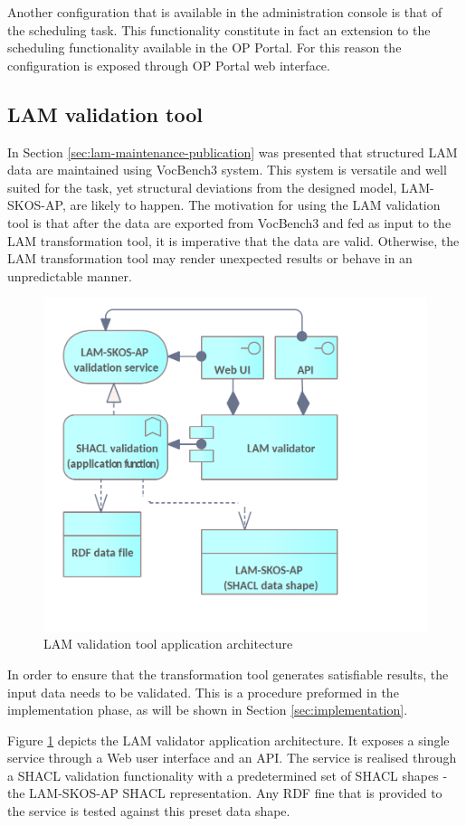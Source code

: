 	Another configuration that is available in the administration console is that of the scheduling task. This functionality constitute in fact an extension to the scheduling functionality available in the OP Portal. For this reason the configuration is exposed through OP Portal web interface. 
	
	\subsection{LAM validation tool}
	
	In Section \ref{sec:lam-maintenance-publication} was presented that structured LAM data are maintained using VocBench3 system. This system is versatile and well suited for the task, yet structural deviations from the designed model, LAM-SKOS-AP, are likely to happen. 
	The motivation for using the LAM validation tool is that after the data are exported from VocBench3 and fed as input to the LAM transformation tool, it is imperative that the data are valid. Otherwise, the LAM transformation tool may render unexpected results or behave in an unpredictable manner. 
	
 	\begin{figure}[!h]
		\centering
		\includegraphics[width=.517\textwidth]{images/application/LAM Validator.png}
		\caption{LAM validation tool application architecture}
		\label{fig:app-lam-validator}
	\end{figure}

	In order to ensure that the transformation tool generates satisfiable results, the input data needs to be validated. This is a procedure preformed in the implementation phase, as will be shown in Section \ref{sec:implementation}. 
	
	Figure \ref{fig:app-lam-validator} depicts the LAM validator application architecture. It exposes a single service through a Web user interface and an API. The service is realised through a SHACL \citep{shacl-spec} validation functionality with a predetermined set of SHACL shapes - the LAM-SKOS-AP\citep{lam-skos-ap-2019} SHACL representation. Any RDF fine that is provided to the service is tested against this preset data shape. 


